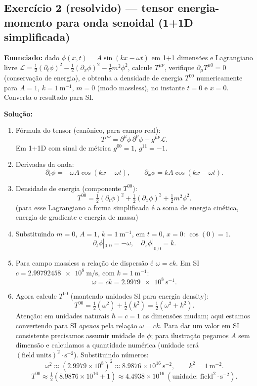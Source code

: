 \documentclass[12pt,a4paper]{article}
\begin{document}
\subsection{Exercício 2 (resolvido) — tensor energia-momento para onda senoidal (1+1D simplificada)}
\textbf{Enunciado:} dado $\phi(x,t)=A\sin(kx-\omega t)$ em 1+1 dimensões e Lagrangiano livre $\mathcal{L}=\tfrac12(\partial_t\phi)^2 - \tfrac12(\partial_x\phi)^2 - \tfrac12 m^2\phi^2$, calcule $T^{\mu\nu}$, verifique $\partial_\mu T^{\mu0}=0$ (conservação de energia), e obtenha a densidade de energia $T^{00}$ numericamente para $A=1$, $k=1\ \mathrm{m^{-1}}$, $m=0$ (modo massless), no instante $t=0$ e $x=0$. Converta o resultado para SI.

\textbf{Solução:}
\begin{enumerate}
  \item Fórmula do tensor (canônico, para campo real):
  \[
  T^{\mu\nu} = \partial^\mu\phi\,\partial^\nu\phi - g^{\mu\nu}\mathcal{L}.
  \]
  Em 1+1D com sinal de métrica $g^{00}=1$, $g^{11}=-1$.
  \item Derivadas da onda:
  \[
  \partial_t\phi = -\omega A\cos(kx-\omega t),\qquad \partial_x\phi = k A\cos(kx-\omega t).
  \]
  \item Densidade de energia (componente $T^{00}$):
  \[
  T^{00} = \tfrac12(\partial_t\phi)^2 + \tfrac12(\partial_x\phi)^2 + \tfrac12 m^2\phi^2.
  \]
  (para esse Lagrangiano a forma simplificada é a soma de energia cinética, energia de gradiente e energia de massa)
  \item Substituindo $m=0$, $A=1$, $k=1\ \mathrm{m^{-1}}$, em $t=0$, $x=0$: $\cos(0)=1$.
  \[
  \partial_t\phi|_{0,0} = -\omega,\quad \partial_x\phi|_{0,0} = k.
  \]
  \item Para campo massless a relação de dispersão é $\omega = c k$. Em SI $c=\num{2.99792458e8}\ \mathrm{m/s}$, com $k=1\ \mathrm{m^{-1}}$:
  \[
  \omega = c k = \num{2.9979e8}\ \mathrm{s^{-1}}.
  \]
  \item Agora calcule $T^{00}$ (mantendo unidades SI para energia density):
  \[
  T^{00} = \tfrac12(\omega^2) + \tfrac12(k^2) = \tfrac12(\omega^2 + k^2).
  \]
  Atenção: em unidades naturais $\hbar=c=1$ as dimensões mudam; aqui estamos convertendo para SI \emph{apenas} pela relação $\omega=ck$. Para dar um valor em SI consistente precisamos assumir unidade de $\phi$; para ilustração pegamos $A$ sem dimensão e calculamos a quantidade numérica (unidade será \(\mathrm{(field\ units)}^2 \cdot \mathrm{s^{-2}}\)). Substituindo números:
  \[
  \omega^2 \approx (2.9979\times10^8)^2 \approx 8.9876\times10^{16}\ \mathrm{s^{-2}},\qquad k^2=1\ \mathrm{m^{-2}}.
  \]
  \[
  T^{00} \approx \tfrac12(8.9876\times10^{16} + 1) \approx 4.4938\times10^{16}\ (\text{unidade: } \text{field}^2\cdot \mathrm{s}^{-2}).
  \]
\end{enumerate}
\end{document}
